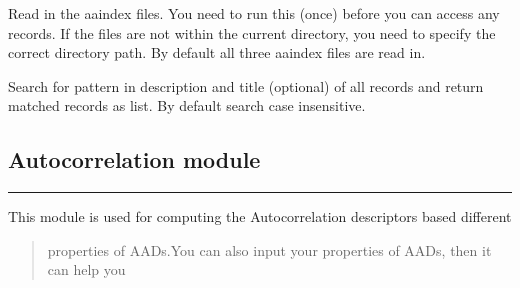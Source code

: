 \documentclass[letterpaper,10pt,english]{sphinxmanual}
\begin{document}

\begin{fulllineitems}
\label{reference/AAIndex:AAIndex.init}
Read in the aaindex files. You need to run this (once) before you can
access any records. If the files are not within the current directory,
you need to specify the correct directory path. By default all three
aaindex files are read in.

\end{fulllineitems}


\begin{fulllineitems}
\label{reference/AAIndex:AAIndex.init_from_file}
\end{fulllineitems}


\begin{fulllineitems}
\label{reference/AAIndex:AAIndex.search}
Search for pattern in description and title (optional) of all records and
return matched records as list. By default search case insensitive.

\end{fulllineitems}



\subsection{Autocorrelation module}
\label{reference/Autocorrelation::doc}\label{reference/Autocorrelation:autocorrelation-module}\label{reference/Autocorrelation:module-Autocorrelation}

\bigskip\hrule{}\bigskip


This module is used for computing the Autocorrelation descriptors based different
\begin{quote}

properties of AADs.You can also input your properties of AADs, then it can help you
\end{quote}
\end{document}
